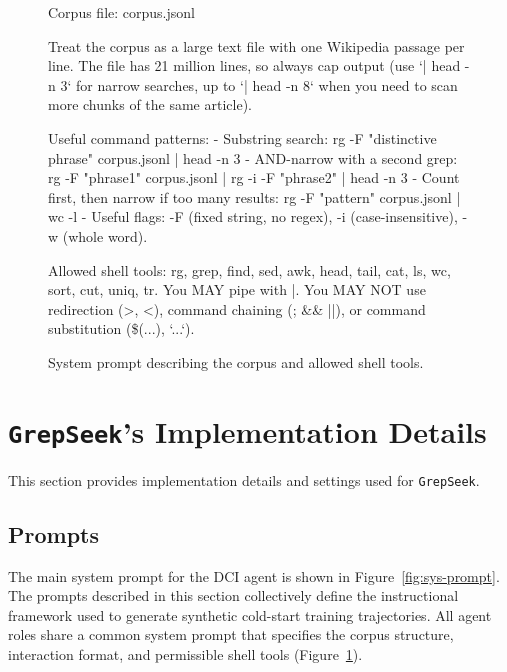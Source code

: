 \documentclass{article} %
\newcommand{\ourmethod}{\texttt{GrepSeek}\xspace}
\begin{document}
\begin{figure}[!t]
\begin{promptbox}
Corpus file: corpus.jsonl

Treat the corpus as a large text file with one Wikipedia passage per line. The file has 21 million lines, so always cap output (use `| head -n 3` for narrow searches, up to `| head -n 8` when you need to scan more chunks of the same article).

Useful command patterns:
- Substring search:
    rg -F "distinctive phrase" corpus.jsonl | head -n 3
- AND-narrow with a second grep:
    rg -F "phrase1" corpus.jsonl | rg -i -F "phrase2" | head -n 3
- Count first, then narrow if too many results:
    rg -F "pattern" corpus.jsonl | wc -l
- Useful flags: -F (fixed string, no regex), -i (case-insensitive), -w (whole word).

Allowed shell tools: rg, grep, find, sed, awk, head, tail, cat, ls, wc, sort, cut, uniq, tr.
You MAY pipe with |. You MAY NOT use redirection (>, <), command chaining (; && ||), or command substitution (\$(...), `...`).
\end{promptbox}
\vspace{-0.4cm}
\caption{System prompt describing the corpus and allowed shell tools.}
\label{fig:prompt_corpus_desc}
\end{figure}

\newpage
\section{\ourmethod's Implementation Details}
\label{app:our-implementation}

This section provides implementation details and settings used for \ourmethod.

\subsection{Prompts}

The main system prompt for the DCI agent is shown in Figure~\ref{fig:sys-prompt}. The prompts described in this section collectively define the instructional framework used to generate synthetic cold-start training trajectories. All agent roles share a common system prompt that specifies the corpus structure, interaction format, and permissible shell tools (Figure~\ref{fig:prompt_corpus_desc}).
\end{document}
